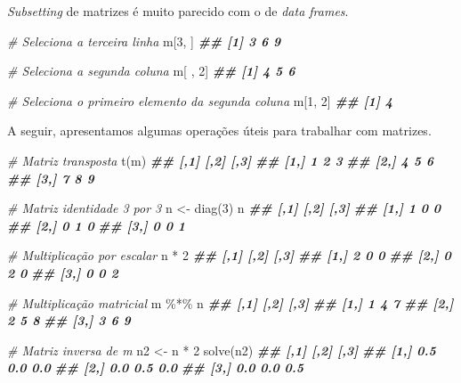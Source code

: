 \documentclass[
]{book}
\newenvironment{Shaded}{\begin{snugshade}}{\end{snugshade}}
\newcommand{\CommentTok}[1]{\textcolor[rgb]{0.56,0.35,0.01}{\textit{#1}}}
\newcommand{\DecValTok}[1]{\textcolor[rgb]{0.00,0.00,0.81}{#1}}
\newcommand{\DocumentationTok}[1]{\textcolor[rgb]{0.56,0.35,0.01}{\textbf{\textit{#1}}}}
\newcommand{\FunctionTok}[1]{\textcolor[rgb]{0.00,0.00,0.00}{#1}}
\newcommand{\NormalTok}[1]{#1}
\newcommand{\OtherTok}[1]{\textcolor[rgb]{0.56,0.35,0.01}{#1}}
\newcommand{\SpecialCharTok}[1]{\textcolor[rgb]{0.00,0.00,0.00}{#1}}
\begin{document}
\emph{Subsetting} de matrizes é muito parecido com o de \emph{data frames}.

\begin{Shaded}
\begin{Highlighting}[]
\CommentTok{\# Seleciona a terceira linha}
\NormalTok{m[}\DecValTok{3}\NormalTok{, ]}
\DocumentationTok{\#\# [1] 3 6 9}

\CommentTok{\# Seleciona a segunda coluna}
\NormalTok{m[ , }\DecValTok{2}\NormalTok{]   }
\DocumentationTok{\#\# [1] 4 5 6}

\CommentTok{\# Seleciona o primeiro elemento da segunda coluna}
\NormalTok{m[}\DecValTok{1}\NormalTok{, }\DecValTok{2}\NormalTok{]}
\DocumentationTok{\#\# [1] 4}
\end{Highlighting}
\end{Shaded}

A seguir, apresentamos algumas operações úteis para trabalhar com matrizes.

\begin{Shaded}
\begin{Highlighting}[]
\CommentTok{\# Matriz transposta}
\FunctionTok{t}\NormalTok{(m)     }
\DocumentationTok{\#\#      [,1] [,2] [,3]}
\DocumentationTok{\#\# [1,]    1    2    3}
\DocumentationTok{\#\# [2,]    4    5    6}
\DocumentationTok{\#\# [3,]    7    8    9}

\CommentTok{\# Matriz identidade 3 por 3}
\NormalTok{n }\OtherTok{\textless{}{-}} \FunctionTok{diag}\NormalTok{(}\DecValTok{3}\NormalTok{)}
\NormalTok{n}
\DocumentationTok{\#\#      [,1] [,2] [,3]}
\DocumentationTok{\#\# [1,]    1    0    0}
\DocumentationTok{\#\# [2,]    0    1    0}
\DocumentationTok{\#\# [3,]    0    0    1}

\CommentTok{\# Multiplicação por escalar}
\NormalTok{n }\SpecialCharTok{*} \DecValTok{2}
\DocumentationTok{\#\#      [,1] [,2] [,3]}
\DocumentationTok{\#\# [1,]    2    0    0}
\DocumentationTok{\#\# [2,]    0    2    0}
\DocumentationTok{\#\# [3,]    0    0    2}

\CommentTok{\# Multiplicação matricial}
\NormalTok{m }\SpecialCharTok{\%*\%}\NormalTok{ n}
\DocumentationTok{\#\#      [,1] [,2] [,3]}
\DocumentationTok{\#\# [1,]    1    4    7}
\DocumentationTok{\#\# [2,]    2    5    8}
\DocumentationTok{\#\# [3,]    3    6    9}

\CommentTok{\# Matriz inversa de m}
\NormalTok{n2 }\OtherTok{\textless{}{-}}\NormalTok{ n }\SpecialCharTok{*} \DecValTok{2}
\FunctionTok{solve}\NormalTok{(n2)  }
\DocumentationTok{\#\#      [,1] [,2] [,3]}
\DocumentationTok{\#\# [1,]  0.5  0.0  0.0}
\DocumentationTok{\#\# [2,]  0.0  0.5  0.0}
\DocumentationTok{\#\# [3,]  0.0  0.0  0.5}
\end{Highlighting}
\end{Shaded}
\end{document}
